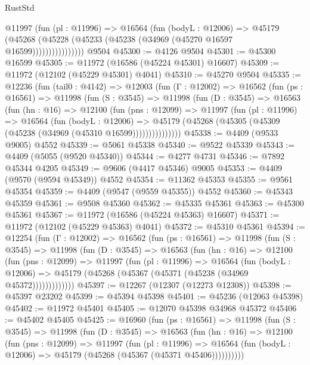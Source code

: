 \begin{lexlean}{RustStd}
\begin{coremodule}
                  @11997
                    (fun (pl : @11996) =>
                    @16564
                      (fun (bodyL : @12006) =>
                      @45179
                        (@45268
                          (@45228 (@45233 (@45238 (@34969 (@45270 @16597 @16599))))))))))))))))
    @9504
@45300 := @4126 @9504
@45301 := @45300 @16599
@45305 := @11972 (@16586 (@45224 @45301) @16607)
@45309 := @11972 (@12102 (@45229 @45301) @4041)
@45310 := @45270 @9504
@45335 := @12236
    (fun (tail0 : @4142) =>
    @12003
      (fun (Γ : @12002) =>
      @16562
        (fun (ps : @16561) =>
        @11998
          (fun (S : @3545) =>
          @11998
            (fun (D : @3545) =>
            @16563
              (fun (hn : @16) =>
              @12100
                (fun (pns : @12099) =>
                @11997
                  (fun (pl : @11996) =>
                  @16564
                    (fun (bodyL : @12006) =>
                    @45179 (@45268 (@45305 (@45309 (@45238 (@34969 (@45310 @16599)))))))))))))))
@45338 := @4409 (@9533 @9005) @4552
@45339 := @5061 @45338
@45340 := @9522 @45339
@45343 := @4409 (@5055 (@9520 @45340))
@45344 := @4277 @4731
@45346 := @7892 @45344 @4205
@45349 := @9606 (@4417 @45346) @9005
@45353 := @4409 (@9570 (@9594 @45349)) @4552
@45354 := @11362 @45353
@45355 := @9561 @45354
@45359 := @4409 (@9547 (@9559 @45355)) @4552
@45360 := @45343 @45359
@45361 := @9508 @45360
@45362 := @45335 @45361
@45363 := @45300 @45361
@45367 := @11972 (@16586 (@45224 @45363) @16607)
@45371 := @11972 (@12102 (@45229 @45363) @4041)
@45372 := @45310 @45361
@45394 := @12254
    (fun (Γ : @12002) =>
    @16562
      (fun (ps : @16561) =>
      @11998
        (fun (S : @3545) =>
        @11998
          (fun (D : @3545) =>
          @16563
            (fun (hn : @16) =>
            @12100
              (fun (pns : @12099) =>
              @11997
                (fun (pl : @11996) =>
                @16564
                  (fun (bodyL : @12006) =>
                  @45179 (@45268 (@45367 (@45371 (@45238 (@34969 @45372)))))))))))))
@45397 := @12267 (@12307 (@12273 @12308))
@45398 := @45397 @23202
@45399 := @45394 @45398
@45401 := @45236 (@12063 @45398)
@45402 := @11972 @45401
@45405 := @12070 @45398 @34968 @45372
@45406 := @45402 @45405
@45425 := @16960
    (fun (ps : @16561) =>
    @11998
      (fun (S : @3545) =>
      @11998
        (fun (D : @3545) =>
        @16563
          (fun (hn : @16) =>
          @12100
            (fun (pns : @12099) =>
            @11997
              (fun (pl : @11996) =>
              @16564 (fun (bodyL : @12006) => @45179 (@45268 (@45367 (@45371 @45406))))))))))

\end{coremodule}
\end{lexlean}
